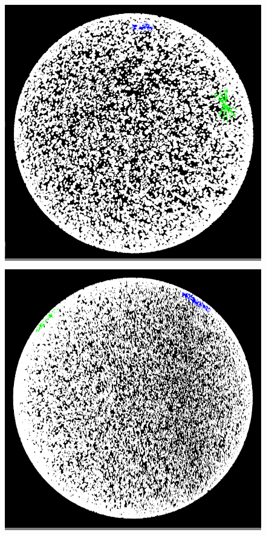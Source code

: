 \documentclass{article}
\begin{document}
\begin{figure}
    \begin{minipage}{0.45\textwidth}
    \colorbox{gray}{\includegraphics[width=\linewidth]{./images/sphere_0.png}}
    \end{minipage}
    \hspace{\fill}
    \begin{minipage}{0.45\textwidth}
    \colorbox{gray}{\includegraphics[width=\linewidth]{./images/sphere_1.png}}

\end{minipage}
\end{figure}
\end{document}
